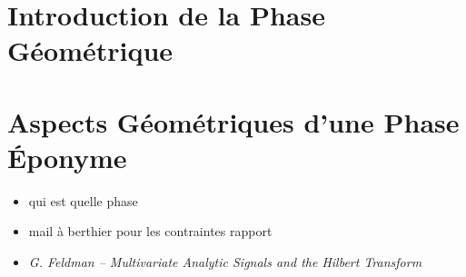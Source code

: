 \newpage








\part{Introduction de la Phase Géométrique} \label{part:param_instant} 




\part{Aspects Géométriques d'une Phase Éponyme} \label{part:phase_geo} 





	
	


	



\newpage
\begin{itemize}
	\item qui est quelle phase
	\item mail à berthier pour les contraintes rapport
	\item \textit{G. Feldman – Multivariate Analytic Signals and the Hilbert Transform}
\end{itemize}
	
	
	

\newpage

\listoffigures
\vfill
\lstlistoflistings
\vfill

\newpage

{}


